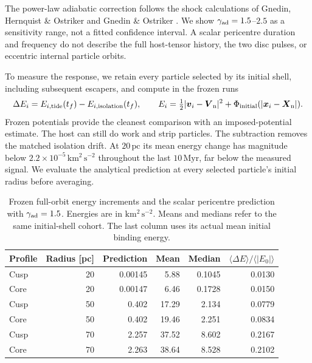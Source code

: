 \documentclass[11pt,a4paper]{article}
\newcommand{\pc}{\,\mathrm{pc}}
\newcommand{\Myr}{\,\mathrm{Myr}}
\begin{document}
The power-law adiabatic correction follows the shock calculations of
Gnedin, Hernquist \& Ostriker and Gnedin \& Ostriker
\cite{GHO1999,GO1999}. We show $\gamma_{\rm ad}=1.5$--$2.5$ as a sensitivity
range, not a fitted confidence interval. A scalar pericentre duration and
frequency do not describe the full host-tensor history, the two disc pulses,
or eccentric internal particle orbits.

To measure the response, we retain every particle selected by its initial
shell, including subsequent escapers, and compute in the frozen runs
\begin{equation}
 \Delta E_i=E_{i,\rm tide}(t_f)-E_{i,\rm isolation}(t_f),\qquad
 E_i=\tfrac12|\boldsymbol v_i-\boldsymbol V_{\rm n}|^2
       +\Phi_{\rm initial}(|\boldsymbol x_i-\boldsymbol X_{\rm n}|).
 \label{eq:matched-heating}
\end{equation}
Frozen potentials provide the cleanest comparison with an imposed-potential
estimate. The host can still do work and strip particles. The subtraction
removes the matched isolation drift. At $20\pc$ its mean energy change
has magnitude below $2.2\times10^{-5}\,\mathrm{km^2\,s^{-2}}$ throughout
the last $10\Myr$, far below the measured signal. We evaluate the analytical
prediction at every selected particle's initial radius before averaging.

\begin{table}[htbp]
\centering\small
\caption{Frozen full-orbit energy increments and the scalar pericentre
prediction with $\gamma_{\rm ad}=1.5$. Energies are in
$\mathrm{km^2\,s^{-2}}$. Means and medians refer to the same initial-shell
cohort. The last column uses its actual mean initial binding energy.}
\label{tab:analytic-energy}
\begin{tabular}{lrrrrr}
\toprule
Profile & Radius [pc] & Prediction & Mean & Median &
$\langle\Delta E\rangle/\langle|E_0|\rangle$\\
\midrule
Cusp & 20 & 0.00145 & 5.88 & 0.1045 & 0.0130\\
Core & 20 & 0.00147 & 6.46 & 0.1728 & 0.0150\\
Cusp & 50 & 0.402 & 17.29 & 2.134 & 0.0779\\
Core & 50 & 0.402 & 19.46 & 2.251 & 0.0834\\
Cusp & 70 & 2.257 & 37.52 & 8.602 & 0.2167\\
Core & 70 & 2.263 & 38.64 & 8.528 & 0.2102\\
\bottomrule
\end{tabular}
\end{table}
\end{document}
